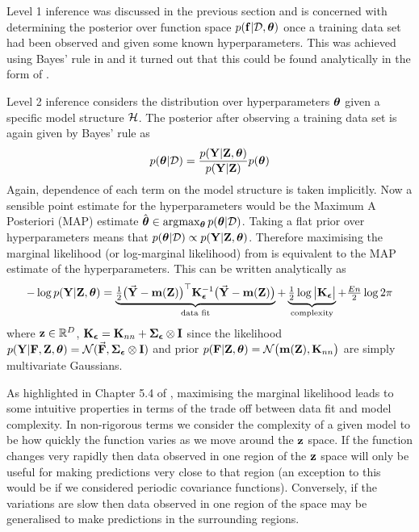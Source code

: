 Level 1 inference was discussed in the previous section and is concerned with determining the posterior over function space $p(\mathbf{f}|\mathcal{D},\boldsymbol{\theta})$ once a training data set had been observed and given some known hyperparameters. This was achieved using Bayes' rule in  and it turned out that this could be found analytically in the form of .

Level 2 inference considers the distribution over hyperparameters $\boldsymbol{\theta}$ given a specific model structure $\mathcal{H}$. The posterior after observing a training data set is again given by Bayes' rule as
\begin{equation}
p(\boldsymbol{\theta}|\mathcal{D}) = \frac{p(\mathbf{Y}|\mathbf{Z},\boldsymbol{\theta})}{p(\mathbf{Y}|\mathbf{Z})} p(\boldsymbol{\theta}) \label{eqn:hypbayes}
\end{equation}
Again, dependence of each term on the model structure is taken implicitly. Now a sensible point estimate for the hyperparameters would be the Maximum A Posteriori (MAP) estimate $\hat{\boldsymbol{\theta}} \in \arg\!\max_{\boldsymbol{\theta}}p(\boldsymbol{\theta}|\mathcal{D})$. Taking a flat prior over hyperparameters means that $p(\boldsymbol{\theta}|\mathcal{D}) \propto p(\mathbf{Y}|\mathbf{Z},\boldsymbol{\theta})$. Therefore maximising the marginal likelihood (or log-marginal likelihood) from  is equivalent to the MAP estimate of the hyperparameters. This can be written analytically as
\begin{align}
-\log p(\mathbf{Y}|\mathbf{Z},\boldsymbol{\theta}) = 
\underbrace{ \tfrac{1}{2} \big(\vec{\mathbf{Y}}-\mathbf{m}(\mathbf{Z})\big)^\top \mathbf{K}_{\boldsymbol{\epsilon}}^{-1} \big(\vec{\mathbf{Y}}-\mathbf{m}(\mathbf{Z})\big) }_
{\text{data fit}}
+ \underbrace{\tfrac{1}{2}\log\big|\mathbf{K}_{\boldsymbol{\epsilon}}\big|}_
{\text{complexity}} + \tfrac{En}{2}\log 2\pi \label{eqn:logmar}
\end{align}
where $\mathbf{z} \in \mathbb{R}^D$, $\mathbf{K}_{\boldsymbol{\epsilon}} = \mathbf{K}_{nn}+\boldsymbol{\Sigma}_{\boldsymbol{\epsilon}}\otimes\mathbf{I}$ since the likelihood $p(\mathbf{Y}|\mathbf{F},\mathbf{Z},\boldsymbol{\theta}) = \mathcal{N}(\vec{\mathbf{F}},\boldsymbol{\Sigma}_{\boldsymbol{\epsilon}}\otimes\mathbf{I})$ and prior $p(\mathbf{F}|\mathbf{Z},\boldsymbol{\theta}) = \mathcal{N}\big(\mathbf{m}(\mathbf{Z}), \mathbf{K}_{nn}\big)$ are simply multivariate Gaussians.

As highlighted in Chapter 5.4 of \cite{RaWi06}, maximising the marginal likelihood leads to some intuitive properties in terms of the trade off between data fit and model complexity. In non-rigorous terms we consider the complexity of a given model to be how quickly the function varies as we move around the $\mathbf{z}$ space. If the function changes very rapidly then data observed in one region of the $\mathbf{z}$ space will only be useful for making predictions very close to that region (an exception to this would be if we considered periodic covariance functions). Conversely, if the variations are slow then data observed in one region of the space may be generalised to make predictions in the surrounding regions. 

